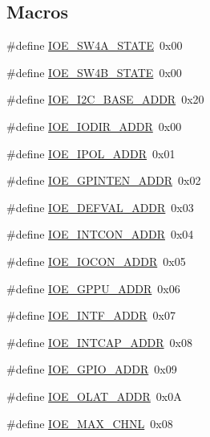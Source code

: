 \subsection*{Macros}
\begin{DoxyCompactItemize}
\item 
\#define \hyperlink{a00023_a0cfe7137edc026282b36312077954701}{I\-O\-E\-\_\-\-S\-W4\-A\-\_\-\-S\-T\-A\-T\-E}~0x00
\item 
\#define \hyperlink{a00023_a5704aece7ac84dbd34e918fc0c60108d}{I\-O\-E\-\_\-\-S\-W4\-B\-\_\-\-S\-T\-A\-T\-E}~0x00
\item 
\#define \hyperlink{a00023_ab848e49bf7c4ea73e4ef05f26b3c60e8}{I\-O\-E\-\_\-\-I2\-C\-\_\-\-B\-A\-S\-E\-\_\-\-A\-D\-D\-R}~0x20
\item 
\#define \hyperlink{a00023_a36c134b088cc2e64e0a5e14e8f90fe38}{I\-O\-E\-\_\-\-I\-O\-D\-I\-R\-\_\-\-A\-D\-D\-R}~0x00
\item 
\#define \hyperlink{a00023_a04633cd2ea7fd0b332e1edf066f674c4}{I\-O\-E\-\_\-\-I\-P\-O\-L\-\_\-\-A\-D\-D\-R}~0x01
\item 
\#define \hyperlink{a00023_aa68be5a6ed28fb146600b4fd2d11fafd}{I\-O\-E\-\_\-\-G\-P\-I\-N\-T\-E\-N\-\_\-\-A\-D\-D\-R}~0x02
\item 
\#define \hyperlink{a00023_a687e15212e8d4b49c12159dce73eeeab}{I\-O\-E\-\_\-\-D\-E\-F\-V\-A\-L\-\_\-\-A\-D\-D\-R}~0x03
\item 
\#define \hyperlink{a00023_a90945d9544eebc892154f1e0443b1407}{I\-O\-E\-\_\-\-I\-N\-T\-C\-O\-N\-\_\-\-A\-D\-D\-R}~0x04
\item 
\#define \hyperlink{a00023_af44ed2bf93808aeb932ce9944a942b75}{I\-O\-E\-\_\-\-I\-O\-C\-O\-N\-\_\-\-A\-D\-D\-R}~0x05
\item 
\#define \hyperlink{a00023_a91e588d697383f94de2bf7f11d9ecb4b}{I\-O\-E\-\_\-\-G\-P\-P\-U\-\_\-\-A\-D\-D\-R}~0x06
\item 
\#define \hyperlink{a00023_a32cac2ad5af58a2562540ec8fc205dd1}{I\-O\-E\-\_\-\-I\-N\-T\-F\-\_\-\-A\-D\-D\-R}~0x07
\item 
\#define \hyperlink{a00023_ac0afd8503a8584599cc81f3d9b0a04dc}{I\-O\-E\-\_\-\-I\-N\-T\-C\-A\-P\-\_\-\-A\-D\-D\-R}~0x08
\item 
\#define \hyperlink{a00023_af2d85152c5775a221f107d6de547bca1}{I\-O\-E\-\_\-\-G\-P\-I\-O\-\_\-\-A\-D\-D\-R}~0x09
\item 
\#define \hyperlink{a00023_ab26864d7372ac11db9c1996842a3cf56}{I\-O\-E\-\_\-\-O\-L\-A\-T\-\_\-\-A\-D\-D\-R}~0x0\-A
\item 
\#define \hyperlink{a00023_a0ad928de8e88a9285e391d1c7b4a57c1}{I\-O\-E\-\_\-\-M\-A\-X\-\_\-\-C\-H\-N\-L}~0x08

\end{DoxyCompactItemize}
